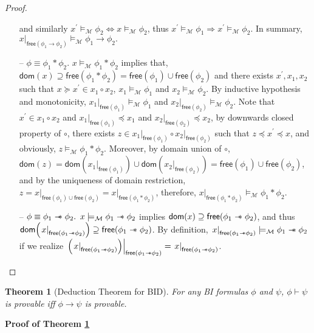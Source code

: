 \documentclass[conference,compsoc, 10pt]{IEEEtran}
\newtheorem{theorem}{Theorem}[section]
\newcommand {\cM } {{\mathcal{M}}}
\newcommand {\Ldom }[1] {{\mathsf{dom}\!\left(#1\right)}}
\newcommand {\Lfree }[1] {{\mathsf{free}{\left(#1\right)}}}
\newcommand {\rt }[2] {{\left.{#1}\right|_{#2}}}
\newcommand {\sepimp} {\mathrel{-\mkern-6mu*}}
\begin{document}
\begin{appendices}
\begin{proof}
\begin{enumerate}
				and similarly $x^\prime\models_\cM \phi_2 \Leftrightarrow x\models_\cM \phi_2$, thus $x^\prime\models_\cM \phi_1\Rightarrow x^\prime\models_\cM \phi_2$. In summary, $\rt{x}{\Lfree{\phi_1\rightarrow\phi_2}} \models_\cM \phi_1\rightarrow \phi_2.$
				\item[--] $\phi \equiv \phi_1\ast \phi_2.$ $x\models_\cM \phi_1\ast \phi_2$ implies that, $\Ldom{x}\supseteq\Lfree{\phi_1\ast \phi_2} = \Lfree{\phi_1}\cup\Lfree{\phi_2}$ and there exists $x^\prime, x_1, x_2$ such that $x\succeq x^\prime\in x_1\circ x_2$, $x_1\models_\cM\phi_1$ and $x_2\models_\cM\phi_2$. 
				By inductive hypothesis and monotonicity, $\rt{x_1}{\Lfree{\phi_1}}\models_\cM\phi_1$ and $\rt{x_2}{\Lfree{\phi_2}}\models_\cM\phi_2$. Note that $x^\prime\in x_1\circ x_2$ and $\rt{x_1}{\Lfree{\phi_1}}\preceq x_1$ and $\rt{x_2}{\Lfree{\phi_2}}\preceq x_2$, by downwards closed property of $\circ$, there exists $z\in \rt{x_1}{\Lfree{\phi_1}}\circ \rt{x_2}{\Lfree{\phi_2}}$ such that $z\preceq x^\prime \preceq x$, and obviously, $z\models_\cM \phi_1\ast \phi_2$. Moreover, by domain union of $\circ$, $\Ldom{z} = \Ldom{\rt{x_1}{\Lfree{\phi_1}}}\cup\Ldom{\rt{x_2}{\Lfree{\phi_2}}} = \Lfree{\phi_1}\cup\Lfree{\phi_2}$, and by the uniqueness of domain restriction, $z = \rt{x}{\Lfree{\phi_1}\cup\Lfree{\phi_2}} = \rt{x}{\Lfree{\phi_1\ast \phi_2}}$, therefore, $\rt{x}{\Lfree{\phi_1\ast \phi_2}}\models_\cM \phi_1\ast \phi_2$.
				\item[--] $\phi \equiv \phi_1\sepimp \phi_2.$ $x\models_\cM \phi_1\sepimp \phi_2$ implies $\Ldom{x}\supseteq\Lfree{\phi_1\sepimp \phi_2}$, and thus $\Ldom{\rt{x}{\Lfree{\phi_1\sepimp \phi_2}}}\supseteq\Lfree{\phi_1\sepimp \phi_2}$. By definition, $\rt{x}{\Lfree{\phi_1\sepimp \phi_2}}\models_\cM \phi_1\sepimp \phi_2$ if we realize $\rt{\left(\rt{x}{\Lfree{\phi_1\sepimp \phi_2}}\right)}{\Lfree{\phi_1\sepimp \phi_2}} = \rt{x}{\Lfree{\phi_1\sepimp \phi_2}}$.
			\end{enumerate}		
			
		\end{proof}
		
		\vspace{0.5cm}
		
		\begin{theorem}[Deduction Theorem for BID]
			\label{thm deduction for BI}
			For any BI formulas $\phi$ and $\psi$, $\phi\vdash\psi$ is provable iff $\phi\rightarrow\psi$ is provable.
		\end{theorem}
		
		\noindent\textbf{Proof of Theorem \ref{thm deduction for BI}}
		

\end{appendices}
\end{document}

